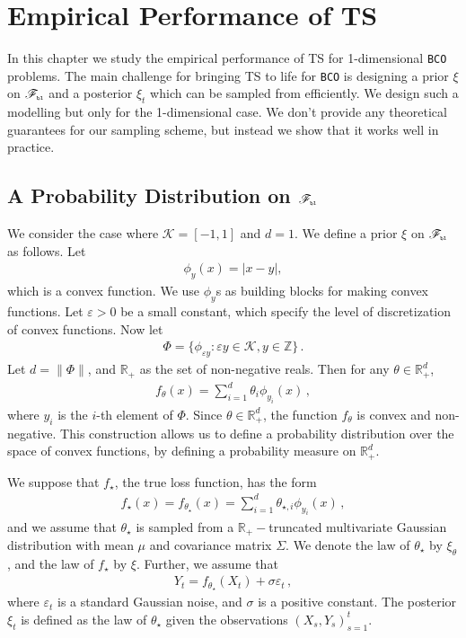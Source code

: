 \documentclass[letter, 12pt]{report}
\newcommand{\pb}{\text{\tiny\texttt{b}}}
\newcommand{\pl}{\text{\tiny\texttt{l}}}
\newcommand{\R}{\mathbb R}
\newcommand{\abs}[1]{\left| #1 \right|}
\newcommand{\cK}{\mathcal K}
\newcommand{\sF}{\mathscr F}
\newcommand{\1}{\mathbf{1}}
\newcommand{\bco}{\texttt{BCO}\xspace}
\newcommand{\ts}{\textsc{TS}\xspace}
\renewcommand{\epsilon}{\varepsilon}
\theoremstyle{plain}
\theoremstyle{definition}
\theoremstyle{remark}
\begin{document}
\chapter{Empirical Performance of \ts}
In this chapter we study the empirical performance of \ts
for 1-dimensional \bco problems.
The main challenge for bringing \ts to life
for \bco is designing a prior $\xi$ on $\sF_{\pb\pl}$
and a posterior $\xi_t$ which can be sampled from efficiently.
We design such a modelling but only for the 1-dimensional case.
We don't provide any theoretical guarantees for our sampling
scheme, but instead we show that it works well in practice.

\section{A Probability Distribution on $\sF_{\pb\pl}$}
\label{sec:ts-empirical}
We consider the case where $\cK = [-1, 1]$ and $d = 1$.
We define a prior $\xi$ on $\sF_{\pb\pl}$ as follows.
Let
\begin{align*}
    \phi_{y}(x) = \abs{x - y},
\end{align*}
which is a convex function.
We use $\phi_y$s as building blocks for making convex functions.
Let $\epsilon > 0$ be a small constant, which specify the level of discretization of convex functions.
Now let
\begin{align}
    \Phi = \{ \phi_{\epsilon y} : \epsilon y \in \cK, y \in \mathbb{Z}\}\,.
\end{align}
Let $d = \|\Phi\|$, and $\R_+$ as the set of non-negative reals.
Then for any $\theta \in \R_+^d$,
\begin{align*}
    f_\theta(x) = \sum_{i=1}^d \theta_i \phi_{y_i}(x)\,,
\end{align*}
where $y_i$ is the $i$-th element of $\Phi$.
Since $\theta \in \R_+^d$, the function $f_\theta$ is convex and non-negative.
This construction allows us to define a probability distribution over the space of convex functions,
by defining a probability measure on $\R_+^d$.

We suppose that $f_\star$, the true loss function, has the form
\begin{align}
    f_\star(x) = f_{\theta_\star}(x) = \sum_{i=1}^d \theta_{\star,i} \phi_{y_i}(x)\,,
\end{align}
and we assume that $\theta_\star$ is sampled from
a $\R_+-$truncated multivariate Gaussian distribution
with mean $\mu$ and covariance matrix $\Sigma$.
We denote the law of $\theta_\star$ by $\xi_\theta$,
and the law of $f_\star$ by $\xi$.
Further, we assume that
\begin{align}
    Y_t = f_{\theta_\star}(X_t) + \sigma \varepsilon_t\,,
\end{align}
where $\varepsilon_t$ is a standard Gaussian noise,
and $\sigma$ is a positive constant.
The posterior $\xi_t$ is defined as the law of $\theta_\star$ given the
observations $(X_s, Y_s)_{s=1}^t$.
\end{document}
